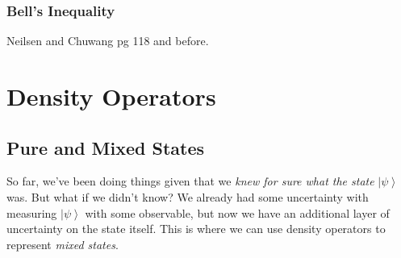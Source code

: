 \documentclass{article}
\newcommand{\ket}[1]{\ensuremath{\left|#1\right\rangle}}
\begin{document}
    \subsubsection{Bell's Inequality} 

      Neilsen and Chuwang pg 118 and before. 

\section{Density Operators} 

  \subsection{Pure and Mixed States}

    So far, we've been doing things given that we \textit{knew for sure what the state } $\ket{\psi}$ was. But what if we didn't know? We already had some uncertainty with measuring $\ket{\psi}$ with some observable, but now we have an additional layer of uncertainty on the state itself. This is where we can use density operators to represent \textit{mixed states}. 
\end{document}
